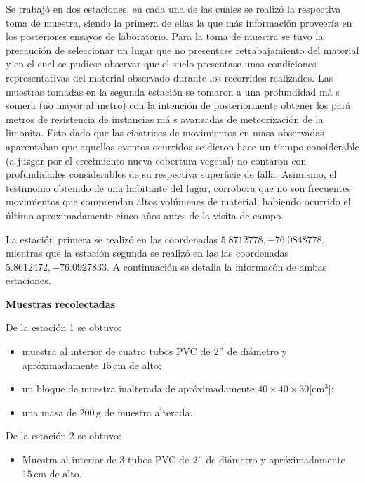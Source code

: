 Se trabaj\'o en dos estaciones, en cada una de las cuales se realiz\'o la respectiva toma de muestra, siendo la primera de ellas la que m\'as informaci\'on proveer\'ia en los posteriores ensayos de laboratorio. Para la toma de muestra se tuvo la precauci\'on de seleccionar un lugar que no presentase retrabajamiento del material y en el cual se pudiese observar que el suelo presentase unas condiciones representativas del material observado durante los recorridos realizados.
Las muestras tomadas en la segunda estaci\'on se tomaron a una profundidad m\'a s somera (no mayor al metro) con la intenci\'on de posteriormente obtener los par\'a metros de resistencia de instancias m\'a s avanzadas de meteorizaci\'on de la limonita. Esto dado que las cicatrices de movimientos en masa observadas aparentaban que aquellos eventos ocurridos se dieron hace un tiempo considerable (a juzgar por el crecimiento nueva cobertura vegetal) no contaron con profundidades considerables de su respectiva superficie de falla. Asimismo, el testimonio obtenido de una habitante del lugar, corrobora que no son frecuentes movimientos que comprendan altos vol\'umenes de material, habiendo ocurrido el \'ultimo aproximadamente cinco a\~nos antes de la visita de campo.

La estaci\'on primera se realiz\'o en las coordenadas \(5.8712778, -76.0848778\), mientras que la estaci\'on segunda se realiz\'o en las las coordenadas \(5.8612472,-76.0927833\).
A continuaci\'on se detalla la informac\'on de ambas estaciones.

\textbf{Muestras recolectadas}

De la estaci\'on 1 se obtuvo:
\begin{itemize}
  \item muestra al interior de cuatro tubos PVC de \(2"\) de di\'ametro y apr\'oximadamente \(15\,\text{cm}\) de alto;
  \item un bloque de muestra inalterada  de apr\'oximadamente \(40 \times 40 \times 30\)[cm\(^3\)];
  \item una masa de \(200\,\text{g}\) de muestra alterada.
\end{itemize}

De la estaci\'on 2 se obtuvo:
\begin{itemize}
  \item Muestra al interior de 3 tubos PVC de \(2"\) de di\'ametro y apr\'oximadamente \(15\,\text{cm}\) de alto.
\end{itemize}

